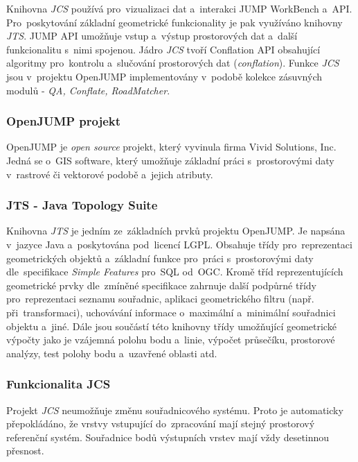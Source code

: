 Knihovna \textit{JCS} používá pro~vizualizaci dat a~interakci JUMP WorkBench
a~API. Pro~poskytování základní geometrické funkcionality je pak využíváno 
knihovny \textit{JTS}. JUMP API umožňuje vstup a~výstup prostorových dat 
a~další funkcionalitu s~nimi spojenou. Jádro \textit{JCS} tvoří Conflation API
obsahující algoritmy pro~kontrolu a~slučování prostorových dat 
(\textit{conflation}). Funkce \textit{JCS} jsou v~projektu OpenJUMP 
implementovány v~podobě kolekce zásuvných modulů - \textit{QA, Conflate, 
RoadMatcher}.

\subsubsection{OpenJUMP projekt}

OpenJUMP je \textit{open source} projekt, který vyvinula firma Vivid Solutions,
Inc. Jedná se o~GIS software, který umožňuje základní práci 
s~prostorovými daty v~rastrové či vektorové podobě a~jejich atributy.

\subsubsection{JTS - Java Topology Suite}
\label{kap:jts}

Knihovna \textit{JTS} je jedním ze~základních prvků projektu OpenJUMP.
Je napsána v~jazyce Java a~poskytována pod~licencí LGPL. Obsahuje třídy 
pro~reprezentaci geometrických objektů a~základní funkce pro~práci 
s~prostorovými daty dle~specifikace \textit{Simple Features} pro~SQL 
od~OGC. Kromě tříd reprezentujících geometrické prvky dle~zmíněné
specifikace zahrnuje další podpůrné třídy pro~reprezentaci seznamu souřadnic,
aplikaci geometrického filtru (např. při~transformaci), uchovávání informace
o~maximální a~minimální souřadnici objektu a~jiné. Dále jsou součástí této 
knihovny třídy umožňující geometrické výpočty jako je vzájemná polohu bodu 
a~linie, výpočet průsečíku, prostorové analýzy, test polohy bodu a~uzavřené
oblasti atd. 

\subsubsection{Funkcionalita JCS} %

Projekt \textit{JCS} neumožňuje změnu souřadnicového systému. Proto je
automaticky přepokládáno, že vrstvy vstupující do~zpracování mají stejný
prostorový referenční systém. Souřadnice bodů výstupních vrstev mají vždy
desetinnou přesnost.  %

